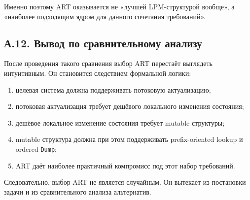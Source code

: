 Именно поэтому ART оказывается не «лучшей LPM-структурой вообще», а
«наиболее подходящим ядром для данного сочетания требований».

\subsection*{А.12. Вывод по сравнительному анализу}

После проведения такого сравнения выбор ART перестаёт выглядеть
интуитивным. Он становится следствием формальной логики:

\begin{enumerate}
\item целевая система должна поддерживать потоковую актуализацию;
\item потоковая актуализация требует дешёвого локального изменения
состояния;
\item дешёвое локальное изменение состояния требует mutable
структуры;
\item mutable структура должна при этом поддерживать prefix-oriented
lookup и ordered \texttt{Dump};
\item ART даёт наиболее практичный компромисс под этот набор
требований.
\end{enumerate}

Следовательно, выбор ART не является случайным. Он вытекает из
постановки задачи и из сравнительного анализа альтернатив.

